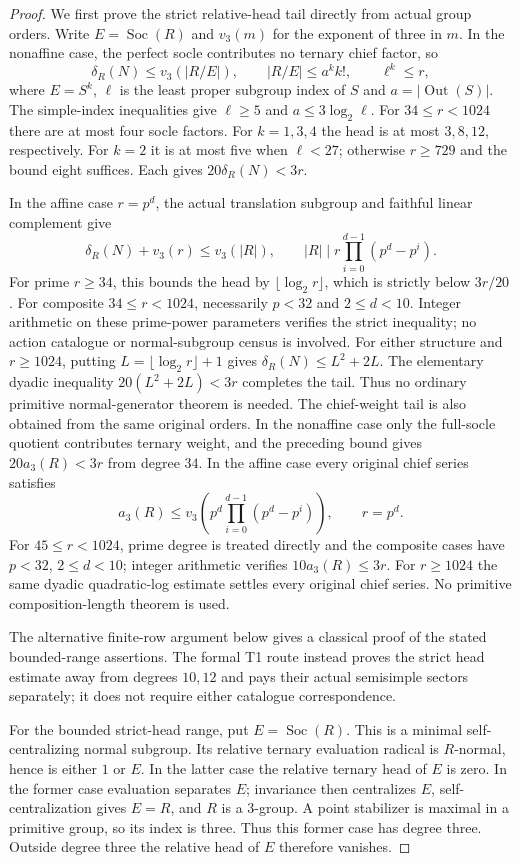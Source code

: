 \begin{proof}
We first prove the strict relative-head tail directly from actual group
orders. Write $E=\operatorname{Soc}(R)$ and $v_3(m)$ for the exponent
of three in $m$. In the nonaffine case, the perfect socle contributes
no ternary chief factor, so
\[
 \delta_R(N)\leq v_3(|R/E|),\qquad
 |R/E|\leq a^k k!,\qquad \ell^k\leq r,
\]
where $E=S^k$, $\ell$ is the least proper subgroup index of $S$ and
$a=|\operatorname{Out}(S)|$. The simple-index inequalities give
$\ell\geq5$ and $a\leq3\log_2\ell$.
For $34\leq r<1024$ there are at most four socle factors.
For $k=1,3,4$ the head is at most $3,8,12$, respectively.
For $k=2$ it is at most five when $\ell<27$; otherwise $r\geq729$
and the bound eight suffices. Each gives $20\delta_R(N)<3r$.

In the affine case $r=p^d$, the actual translation subgroup and
faithful linear complement give
\[
 \delta_R(N)+v_3(r)\leq v_3(|R|),\qquad
 |R|\mid r\prod_{i=0}^{d-1}(p^d-p^i).
\]
For prime $r\geq34$, this bounds the head by $\lfloor\log_2r\rfloor$,
which is strictly below $3r/20$. For composite $34\leq r<1024$,
necessarily $p<32$ and $2\leq d<10$. Integer arithmetic on these
prime-power parameters verifies the strict inequality; no action
catalogue or normal-subgroup census is involved.
For either structure and $r\geq1024$, putting
$L=\lfloor\log_2r\rfloor+1$ gives
$\delta_R(N)\leq L^2+2L$. The elementary dyadic inequality
$20(L^2+2L)<3r$ completes the tail. Thus no ordinary primitive
normal-generator theorem is needed. The chief-weight tail is also obtained
from the same original orders. In the nonaffine case only the full-socle
quotient contributes ternary weight, and the preceding bound gives
$20a_3(R)<3r$ from degree $34$. In the affine case every original chief
series satisfies
\[
 a_3(R)\leq v_3\!\left(p^d\prod_{i=0}^{d-1}(p^d-p^i)\right),\qquad r=p^d.
\]
For $45\leq r<1024$, prime degree is treated directly and the composite
cases have $p<32$, $2\leq d<10$; integer arithmetic verifies
$10a_3(R)\leq3r$. For $r\geq1024$ the same dyadic quadratic-log estimate
settles every original chief series. No primitive composition-length
theorem is used.

The alternative finite-row argument below gives a classical proof of the stated
bounded-range assertions. The formal T1 route instead proves the strict
head estimate away from degrees $10,12$ and pays their actual semisimple
sectors separately; it does not require either catalogue correspondence.

For the bounded strict-head range, put $E=\operatorname{Soc}(R)$.
This is a minimal self-centralizing normal subgroup. Its relative
ternary evaluation radical is $R$-normal, hence is either $1$ or $E$.
In the latter case the relative ternary head of $E$ is zero. In the
former case evaluation separates $E$; invariance then centralizes $E$,
self-centralization gives $E=R$, and $R$ is a $3$-group. A point
stabilizer is maximal in a primitive group, so its index is three.
Thus this former case has degree three. Outside degree three the
relative head of $E$ therefore vanishes.


\end{proof}
